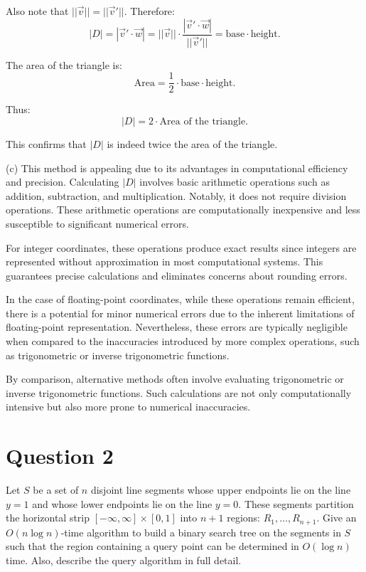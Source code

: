 \documentclass[12pt]{article}
\begin{document}
Also note that \( ||\vec{v}|| = ||\vec{v}'|| \). Therefore:
\[
|D| = |\vec{v}' \cdot \vec{w}| = ||\vec{v}|| \cdot \frac{|\vec{v}' \cdot \vec{w}|}{||\vec{v}'||} = \text{base} \cdot \text{height}.
\]

The area of the triangle is:
\[
\text{Area} = \frac{1}{2} \cdot \text{base} \cdot \text{height}.
\]

Thus:
\[
|D| = 2 \cdot \text{Area of the triangle}.
\]

This confirms that \( |D| \) is indeed twice the area of the triangle.

\vspace{0.5cm}

(c) This method is appealing due to its advantages in computational efficiency and precision. Calculating \( |D| \) involves basic arithmetic operations such as addition, subtraction, and multiplication. Notably, it does not require division operations. These arithmetic operations are computationally inexpensive and less susceptible to significant numerical errors.

For integer coordinates, these operations produce exact results since integers are represented without approximation in most computational systems. This guarantees precise calculations and eliminates concerns about rounding errors.

In the case of floating-point coordinates, while these operations remain efficient, there is a potential for minor numerical errors due to the inherent limitations of floating-point representation. Nevertheless, these errors are typically negligible when compared to the inaccuracies introduced by more complex operations, such as trigonometric or inverse trigonometric functions.

By comparison, alternative methods often involve evaluating trigonometric or inverse trigonometric functions. Such calculations are not only computationally intensive but also more prone to numerical inaccuracies.



\section*{Question 2}

Let $S$ be a set of $n$ disjoint line segments whose upper endpoints lie on the line $y = 1$ and whose lower endpoints lie on the line $y = 0$. These segments partition the horizontal strip $[-\infty, \infty] \times [0, 1]$ into $n + 1$ regions: $R_1, \dots, R_{n+1}$. Give an $O(n \log n)$-time algorithm to build a binary search tree on the segments in $S$ such that the region containing a query point can be determined in $O(\log n)$ time. Also, describe the query algorithm in full detail.
\end{document}
